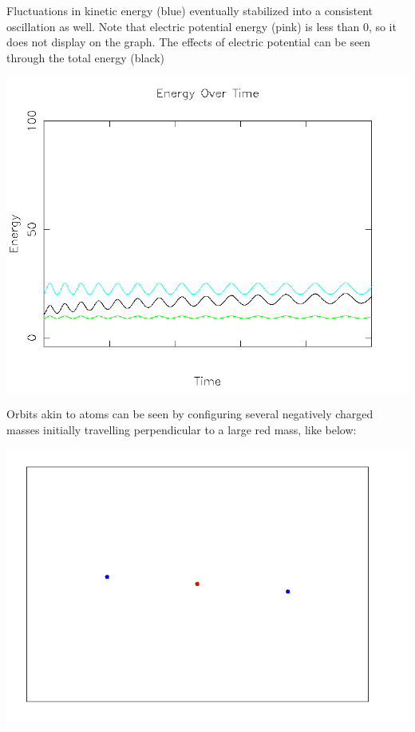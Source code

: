 \documentclass{article}
\begin{document}
Fluctuations in kinetic energy (blue) eventually stabilized into a consistent oscillation as well.
Note that electric potential energy (pink) is less than 0, so it does not display on the graph.
The effects of electric potential can be seen through the total energy (black)
\\
\begin{center}
    \includegraphics[scale=0.5]{orbit_energy}
\end{center}

Orbits akin to atoms can be seen by configuring several negatively charged masses initially travelling perpendicular to a large red mass, like below:
\\
\begin{center}
    \includegraphics[scale=0.5]{atom}
\end{center}
\end{document}
